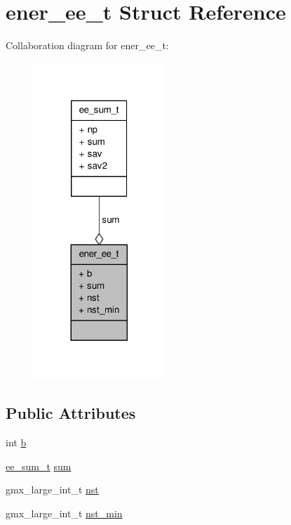 \hypertarget{structener__ee__t}{\section{ener\-\_\-ee\-\_\-t \-Struct \-Reference}
\label{structener__ee__t}
}


\-Collaboration diagram for ener\-\_\-ee\-\_\-t\-:
\nopagebreak
\begin{figure}[H]
\begin{center}
\leavevmode
\includegraphics[width=140pt]{structener__ee__t__coll__graph}
\end{center}
\end{figure}
\subsection*{\-Public \-Attributes}
\begin{DoxyCompactItemize}
\item 
int \hyperlink{structener__ee__t_ae9e7b945b23b4dc71325731471233cad}{b}
\item 
\hyperlink{structee__sum__t}{ee\-\_\-sum\-\_\-t} \hyperlink{structener__ee__t_a88b8415a4fcbd5a725eb10ca1cb98d17}{sum}
\item 
gmx\-\_\-large\-\_\-int\-\_\-t \hyperlink{structener__ee__t_a5cd18cdc3acf834a4513097dc7b7b060}{nst}
\item 
gmx\-\_\-large\-\_\-int\-\_\-t \hyperlink{structener__ee__t_ac0174d3750699becaaf8d8747cb88570}{nst\-\_\-min}
\end{DoxyCompactItemize}


